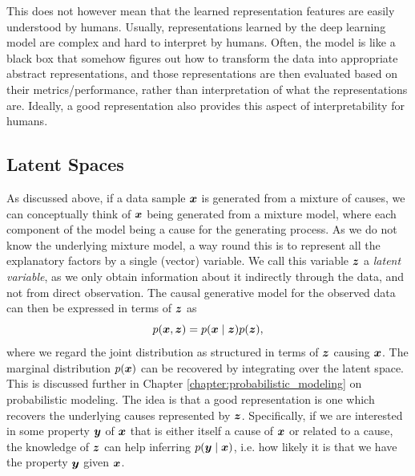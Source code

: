 This does not however mean that the learned representation features are easily understood by humans. Usually, representations learned by the deep learning model are complex and hard to interpret by humans. Often, the model is like a black box that somehow figures out how to transform the data into appropriate abstract representations, and those representations are then evaluated based on their metrics/performance, rather than interpretation of what the representations are. Ideally, a good representation also provides this aspect of interpretability for humans.



\subsection{Latent Spaces}
\label{seq:latent_space}


As discussed above, if a data sample $\bm{ x }$ is generated from a mixture of causes, we can conceptually think of $\bm{ x }$ being generated from a mixture model, where each component of the model being a cause for the generating process. As we do not know the underlying mixture model, a way round this is to represent all the explanatory factors by a single (vector) variable. We call this variable $\bm{ z }$ a \textit{latent variable}, as we only obtain information about it indirectly through the data, and not from direct observation. The causal generative model for the observed data can then be expressed in terms of $\bm{ z }$ as
\[ p(\bm{ x }, \bm{ z }) = p(\bm{ x } \mid \bm{ z }) p(\bm{ z }), \]
where we regard the joint distribution as structured in terms of $\bm{ z }$ causing $\bm{ x }$. The marginal distribution $p(\bm{ x })$ can be recovered by integrating over the latent space. This is discussed further in Chapter \ref{chapter:probabilistic_modeling} on probabilistic modeling. The idea is that a good representation is one which recovers the underlying causes represented by $\bm{ z }$. Specifically, if we are interested in some property $\bm{ y }$ of $\bm{ x }$ that is either itself a cause of $\bm{ x }$ or related to a cause, the knowledge of $\bm{ z }$ can help inferring $p(\bm{ y } \mid \bm{ x })$, i.e. how likely it is that we have the property $\bm{ y }$ given $\bm{ x }$.

